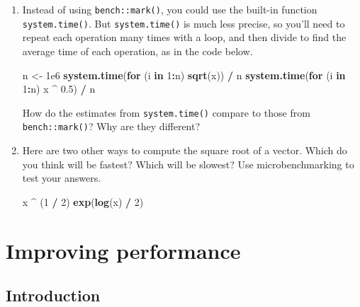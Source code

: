\documentclass[]{book}
\newenvironment{Shaded}{\begin{snugshade}}{\end{snugshade}}
\newcommand{\ControlFlowTok}[1]{\textcolor[rgb]{0.27,0.27,0.27}{\textbf{#1}}}
\newcommand{\DecValTok}[1]{\textcolor[rgb]{0.06,0.06,0.06}{#1}}
\newcommand{\FloatTok}[1]{\textcolor[rgb]{0.06,0.06,0.06}{#1}}
\newcommand{\KeywordTok}[1]{\textcolor[rgb]{0.27,0.27,0.27}{\textbf{#1}}}
\newcommand{\NormalTok}[1]{#1}
\newcommand{\OperatorTok}[1]{\textcolor[rgb]{0.43,0.43,0.43}{\textbf{#1}}}
\newcommand{\StringTok}[1]{\textcolor[rgb]{0.5,0.5,0.5}{#1}}
\begin{document}
\begin{enumerate}
\def\labelenumi{\arabic{enumi}.}
\item
  Instead of using \texttt{bench::mark()}, you could use the built-in function
  \texttt{system.time()}. But \texttt{system.time()} is much less precise, so you'll
  need to repeat each operation many times with a loop, and then divide
  to find the average time of each operation, as in the code below.

\begin{Shaded}
\begin{Highlighting}[]
\NormalTok{n <-}\StringTok{ }\FloatTok{1e6}
\KeywordTok{system.time}\NormalTok{(}\ControlFlowTok{for}\NormalTok{ (i }\ControlFlowTok{in} \DecValTok{1}\OperatorTok{:}\NormalTok{n) }\KeywordTok{sqrt}\NormalTok{(x)) }\OperatorTok{/}\StringTok{ }\NormalTok{n}
\KeywordTok{system.time}\NormalTok{(}\ControlFlowTok{for}\NormalTok{ (i }\ControlFlowTok{in} \DecValTok{1}\OperatorTok{:}\NormalTok{n) x }\OperatorTok{^}\StringTok{ }\FloatTok{0.5}\NormalTok{) }\OperatorTok{/}\StringTok{ }\NormalTok{n}
\end{Highlighting}
\end{Shaded}

  How do the estimates from \texttt{system.time()} compare to those from
  \texttt{bench::mark()}? Why are they different?
\item
  Here are two other ways to compute the square root of a vector. Which
  do you think will be fastest? Which will be slowest? Use microbenchmarking
  to test your answers.

\begin{Shaded}
\begin{Highlighting}[]
\NormalTok{x }\OperatorTok{^}\StringTok{ }\NormalTok{(}\DecValTok{1} \OperatorTok{/}\StringTok{ }\DecValTok{2}\NormalTok{)}
\KeywordTok{exp}\NormalTok{(}\KeywordTok{log}\NormalTok{(x) }\OperatorTok{/}\StringTok{ }\DecValTok{2}\NormalTok{)}
\end{Highlighting}
\end{Shaded}
\end{enumerate}

\hypertarget{perf-improve}{%
\chapter{Improving performance}\label{perf-improve}}

\hypertarget{introduction-9}{%
\section{Introduction}\label{introduction-9}}
\end{document}

